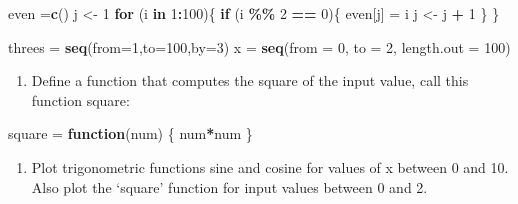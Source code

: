 \documentclass[
]{article}
\newenvironment{Shaded}{\begin{snugshade}}{\end{snugshade}}
\newcommand{\AttributeTok}[1]{\textcolor[rgb]{0.13,0.29,0.53}{#1}}
\newcommand{\ControlFlowTok}[1]{\textcolor[rgb]{0.13,0.29,0.53}{\textbf{#1}}}
\newcommand{\DecValTok}[1]{\textcolor[rgb]{0.00,0.00,0.81}{#1}}
\newcommand{\FunctionTok}[1]{\textcolor[rgb]{0.13,0.29,0.53}{\textbf{#1}}}
\newcommand{\NormalTok}[1]{#1}
\newcommand{\OtherTok}[1]{\textcolor[rgb]{0.56,0.35,0.01}{#1}}
\newcommand{\SpecialCharTok}[1]{\textcolor[rgb]{0.81,0.36,0.00}{\textbf{#1}}}
\providecommand{\tightlist}{%
  \setlength{\itemsep}{0pt}\setlength{\parskip}{0pt}}
\begin{document}
\begin{Shaded}
\begin{Highlighting}[]
\NormalTok{even }\OtherTok{=}\FunctionTok{c}\NormalTok{()}
\NormalTok{j }\OtherTok{\textless{}{-}} \DecValTok{1}
\ControlFlowTok{for}\NormalTok{ (i }\ControlFlowTok{in} \DecValTok{1}\SpecialCharTok{:}\DecValTok{100}\NormalTok{)\{}
    \ControlFlowTok{if}\NormalTok{ (i }\SpecialCharTok{\%\%} \DecValTok{2} \SpecialCharTok{==} \DecValTok{0}\NormalTok{)\{}
\NormalTok{      even[j] }\OtherTok{=}\NormalTok{  i}
\NormalTok{      j }\OtherTok{\textless{}{-}}\NormalTok{ j }\SpecialCharTok{+} \DecValTok{1}
\NormalTok{    \}}
\NormalTok{\}}

\NormalTok{threes }\OtherTok{=} \FunctionTok{seq}\NormalTok{(}\AttributeTok{from=}\DecValTok{1}\NormalTok{,}\AttributeTok{to=}\DecValTok{100}\NormalTok{,}\AttributeTok{by=}\DecValTok{3}\NormalTok{)  }
\NormalTok{x }\OtherTok{=} \FunctionTok{seq}\NormalTok{(}\AttributeTok{from =} \DecValTok{0}\NormalTok{, }\AttributeTok{to =} \DecValTok{2}\NormalTok{, }\AttributeTok{length.out =} \DecValTok{100}\NormalTok{)}
\end{Highlighting}
\end{Shaded}

\begin{enumerate}
\def\labelenumi{\alph{enumi}.}
\setcounter{enumi}{2}
\tightlist
\item
  Define a function that computes the square of the input value, call
  this function square:
\end{enumerate}

\begin{Shaded}
\begin{Highlighting}[]
\NormalTok{square }\OtherTok{=} \ControlFlowTok{function}\NormalTok{(num) \{}
\NormalTok{  num}\SpecialCharTok{*}\NormalTok{num}
\NormalTok{\}}
\end{Highlighting}
\end{Shaded}

\begin{enumerate}
\def\labelenumi{\alph{enumi}.}
\setcounter{enumi}{3}
\tightlist
\item
  Plot trigonometric functions sine and cosine for values of x between 0
  and 10. Also plot the `square' function for input values between 0 and
  2.
\end{enumerate}
\end{document}

